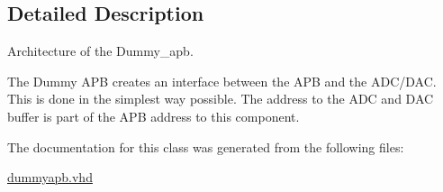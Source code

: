 \subsection{Detailed Description}
Architecture of the Dummy\-\_\-apb. 

The Dummy A\-P\-B creates an interface between the A\-P\-B and the A\-D\-C/\-D\-A\-C. This is done in the simplest way possible. The address to the A\-D\-C and D\-A\-C buffer is part of the A\-P\-B address to this component. 

The documentation for this class was generated from the following files\-:\begin{DoxyCompactItemize}
\item 
\hyperlink{dummyapb_8vhd}{dummyapb.\-vhd}\end{DoxyCompactItemize}
